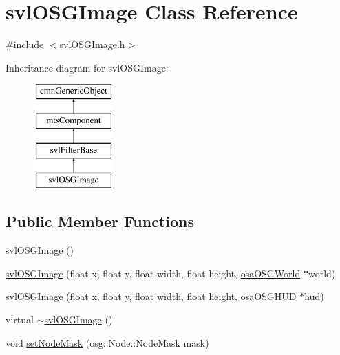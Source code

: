 \hypertarget{classsvl_o_s_g_image}{}\section{svl\+O\+S\+G\+Image Class Reference}
\label{classsvl_o_s_g_image}


{\ttfamily \#include $<$svl\+O\+S\+G\+Image.\+h$>$}

Inheritance diagram for svl\+O\+S\+G\+Image\+:\begin{figure}[H]
\begin{center}
\leavevmode
\includegraphics[height=4.000000cm]{d4/d6e/classsvl_o_s_g_image}
\end{center}
\end{figure}
\subsection*{Public Member Functions}
\begin{DoxyCompactItemize}
\item 
\hyperlink{classsvl_o_s_g_image_a82b755e82f32a0a399697909d94d908b}{svl\+O\+S\+G\+Image} ()
\item 
\hyperlink{classsvl_o_s_g_image_af502581baddb0f29320e3cee836f20b6}{svl\+O\+S\+G\+Image} (float x, float y, float width, float height, \hyperlink{classosa_o_s_g_world}{osa\+O\+S\+G\+World} $\ast$world)
\item 
\hyperlink{classsvl_o_s_g_image_a7c862299dfc4ffeb94fb50995fcdf6b8}{svl\+O\+S\+G\+Image} (float x, float y, float width, float height, \hyperlink{classosa_o_s_g_h_u_d}{osa\+O\+S\+G\+H\+U\+D} $\ast$hud)
\item 
virtual \hyperlink{classsvl_o_s_g_image_a8e28cdd761d29eaf4563252cf906935b}{$\sim$svl\+O\+S\+G\+Image} ()
\item 
void \hyperlink{classsvl_o_s_g_image_a23794ac22b15a36a63ed225a86b5af5e}{set\+Node\+Mask} (osg\+::\+Node\+::\+Node\+Mask mask)
\end{DoxyCompactItemize}
